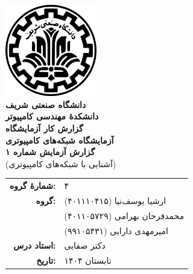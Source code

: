 \documentclass[12pt]{article}
\newcommand{\persianordinal}[1]{%
	\ifcase#1
	\or اول%
	\or دوم%
	\or سوم%
	\or چهارم%
	\or پنجم%
	\or ششم%
	\or هفتم%
	\or هشتم%
	\or نهم%
	\or دهم%
	\or یازدهم%
	\or دوازدهم%
	\or سیزدهم%
	\or چهاردهم%
	\or پانزدهم%
	\or شانزدهم%
	\or هفدهم%
	\or هجدهم%
	\or نوزدهم%
	\or بیستم%
	\else #1\fi
}
\newcommand{\persianordinalpage}{\persianfont\persianordinal{\value{page}}}
\begin{document}
	
	\begin{titlepage}
		\centering
		\vspace*{1cm}
		\includegraphics[width=4cm]{sharif.png}\\[1.5cm]
		{\Large\textbf{دانشگاه صنعتی شریف}}\\[0.5cm]
		{\large\textbf{دانشکدهٔ مهندسی کامپیوتر}}\\[1.5cm]
		{\Huge\textbf{گزارش کار آزمایشگاه}}\\[0.5cm]
		{\LARGE\textbf{آزمایشگاه شبکه‌های کامپیوتری}}\\[2cm]
		
		\textbf{گزارش آزمایش شماره ۱}\\
		(آشنایی با شبکه‌های کامپیوتری)
		
		\vfill
		\begin{tabular}{rl}
			\textbf{شمارهٔ گروه:} & ۴ \\
			\textbf{گروه:} &
			ارشیا یوسف‌نیا (۴۰۱۱۱۰۴۱۵) \\
			& محمد‌فرحان بهرامی (۴۰۱۱۰۵۷۲۹) \\
			& امیرمهدی دارایی (۹۹۱۰۵۴۳۱) \\
			\textbf{استاد درس:} & دکتر صفایی \\
			\textbf{تاریخ:} & تابستان ۱۴۰۴ \\
		\end{tabular}
	\end{titlepage}
	
	\clearpage
	\setcounter{page}{1}
	\renewcommand{\thepage}{\persianordinalpage}
	
	\tableofcontents
	\clearpage
	\listoffigures
	\clearpage
	\listoftables
	
	\clearpage
	\setcounter{page}{1}
	\renewcommand{\thepage}{\persianfont\arabic{page}}
	
	
\end{document}

